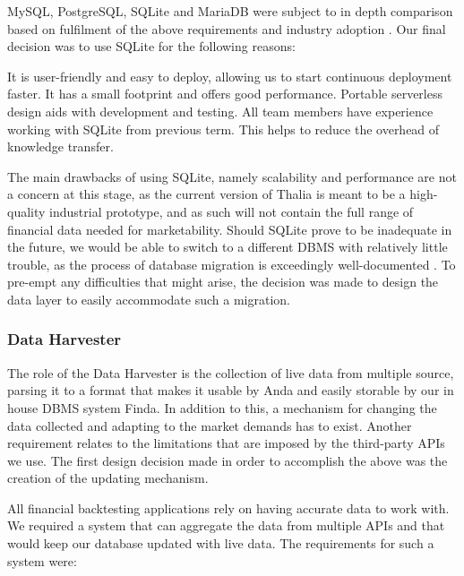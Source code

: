\documentclass[main.tex]{subfiles}
\begin{document}
MySQL, PostgreSQL, SQLite and MariaDB were subject to in depth comparison based on fulfilment of the above requirements and industry adoption \cite{dbPerfComparison} \cite{dbmsMarketShare}. Our final decision was to use SQLite for the following reasons:

It is user-friendly and easy to deploy, allowing us to start continuous deployment faster.
It has a small footprint and offers good performance. \cite{dbPerfComparison}
Portable serverless design aids with development and testing.
All team members have experience working with SQLite from previous term. This helps to reduce the overhead of knowledge transfer.

The main drawbacks of using SQLite, namely scalability and performance are not a concern at this stage, as the current version of Thalia is meant to be a high-quality industrial prototype, and as such will not contain the full range of financial data needed for marketability. Should SQLite prove to be inadequate in the future, we would be able to switch to a different DBMS with relatively little trouble, as the process of database migration is exceedingly well-documented \cite{frameworkDataMigration} \cite{understandingDataMigration}. To pre-empt any difficulties that might arise, the decision was made to design the data layer to easily accommodate such a migration.



\subsubsection{Data Harvester}
\label{Data Harvester}


The role of the Data Harvester is the collection of live data from multiple source, parsing it to a format that makes it usable by Anda and easily storable by our in house DBMS system Finda. In addition to this, a mechanism for changing the data collected and adapting to the market demands has to exist. Another requirement relates to the limitations that are imposed by the third-party APIs we use. The first design decision made in order to accomplish the above was the creation of the updating mechanism.

All financial backtesting applications rely on having accurate data to work with. We required a system that can aggregate the data from multiple APIs and that would keep our database updated with live data.
The requirements for such a system were:
\end{document}
